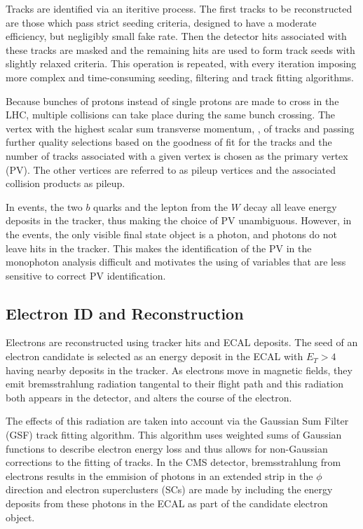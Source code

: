  Tracks are identified via an iteritive process. 
 The first tracks to be reconstructed
  are those which pass strict seeding
  criteria, designed to have a moderate
  efficiency, but negligibly small
  fake rate.
 Then the detector hits associated
  with these tracks are masked
  and the remaining hits are used to
  form track seeds with slightly relaxed
  criteria.
 This operation is repeated, with every
  iteration imposing more complex and time-consuming
  seeding, filtering and track fitting algorithms.
 
 Because bunches of protons instead of single protons
  are made to cross in the LHC, 
  multiple collisions can take place during the same
  bunch crossing.
 The vertex with the highest scalar sum
  transverse momentum, \pt,
  of tracks and passing further quality selections
  based on the goodness of fit for the tracks
  and the number of tracks associated with a given vertex
  is chosen as the primary vertex (PV).
 The other vertices are referred to as
  pileup vertices and the associated collision
  products as pileup.

 In \ppwbblnbb events, the two $b$ quarks and
  the lepton from the $W$ decay all leave energy
  deposits in the tracker, thus making the choice
  of PV unambiguous.
 However, in the \pploneg events,
  the only visible final state object is a photon,
  and photons do not leave hits in the tracker.
 This makes the identification of the PV
  in the monophoton analysis difficult
  and motivates the using of variables that
  are less sensitive to correct PV identification.
  
\subsection{Electron ID and Reconstruction}

 Electrons are reconstructed using tracker
  hits and ECAL deposits.
 The seed of an electron candidate is selected as 
  an energy deposit in the ECAL with $E_T > 4$ \GeV
  having nearby deposits in the tracker.
 As electrons move in magnetic fields,
  they emit bremsstrahlung radiation
  tangental to their flight path
  and this radiation both appears in the detector, 
  and alters the course of the electron.

 The effects of this radiation are taken
  into account via the Gaussian Sum Filter (GSF)
  track fitting algorithm.
 This algorithm uses weighted sums of Gaussian
  functions to describe electron energy loss
  and thus allows for non-Gaussian corrections
  to the fitting of tracks.
 In the CMS detector, 
  bremsstrahlung from electrons results in the
  emmision of photons in an extended strip
  in the $\phi$ direction and electron
  superclusters (SCs) are made by 
  including the energy deposits from 
  these photons in the ECAL as part of the
  candidate electron object.

